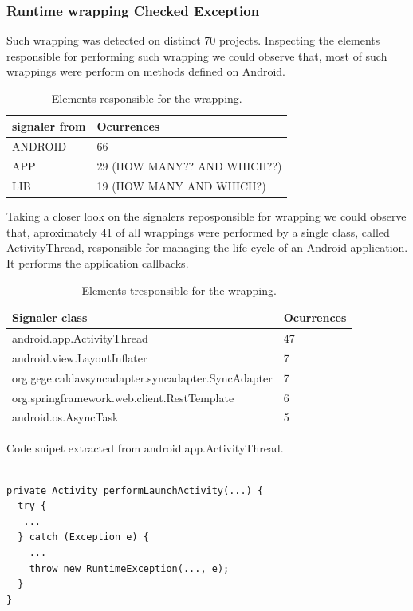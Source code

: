 \documentclass[conference]{IEEEtran}
\begin{document}
\subsubsection{Runtime wrapping Checked Exception}

Such wrapping was detected on distinct 70 projects. Inspecting the 
elements responsible for performing such wrapping we could observe that,
most of such wrappings were perform on methods defined on Android. 


\begin{table}
\centering
\begin{tabular}{ll}
    \hline
    \bfseries{signaler from} & \bfseries{Ocurrences} \\
    \hline
ANDROID	 & 66 \\
APP	& 29 	(HOW MANY?? AND WHICH??) \\
LIB  & 19 (HOW MANY AND WHICH?)\\
\hline
  \end{tabular}
\caption{Elements responsible for the wrapping.}
\label{tab:wrapping01}
\end{table}


Taking a closer look on the signalers reposponsible for wrapping we could observe that, aproximately 41%
of all wrappings were performed by a single class, called ActivityThread, responsible for managing the life cycle 
of an Android application. It performs the application callbacks.


\begin{table}
\centering
\begin{tabular}{ll}
 \bfseries{Signaler class} & \bfseries{Ocurrences} \\
    \hline
android.app.ActivityThread & 47 \\
android.view.LayoutInflater & 7 \\
org.gege.caldavsyncadapter.syncadapter.SyncAdapter & 7 \\
org.springframework.web.client.RestTemplate & 6 \\
android.os.AsyncTask & 5 \\
\hline
  \end{tabular}
\caption{Elements tresponsible for the wrapping.}
\label{tab:wrapping01}
\end{table}

Code snipet extracted from android.app.ActivityThread.

{\footnotesize
\begin{verbatim}

private Activity performLaunchActivity(...) {
  try {
   ...
  } catch (Exception e) {
    ...
    throw new RuntimeException(..., e);
  }
}
\end{verbatim}
}
\end{document}
